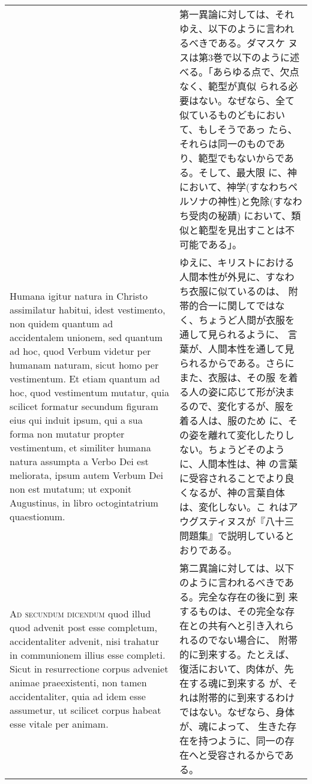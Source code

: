 \documentclass[10pt]{jsarticle} %
\begin{document}
\begin{longtable}{p{21em}p{21em}}
&

第一異論に対しては、それゆえ、以下のように言われるべきである。ダマスケ
ヌスは第3巻で以下のように述べる。「あらゆる点で、欠点なく、範型が真似
られる必要はない。なぜなら、全て似ているものどもにおいて、もしそうであっ
たら、それらは同一のものであり、範型でもないからである。そして、最大限
に、神において、神学(すなわちペルソナの神性)と免除(すなわち受肉の秘蹟)
において、類似と範型を見出すことは不可能である」。

\\



Humana igitur natura in Christo assimilatur habitui, idest vestimento,
non quidem quantum ad accidentalem unionem, sed quantum ad hoc, quod
Verbum videtur per humanam naturam, sicut homo per vestimentum. Et
etiam quantum ad hoc, quod vestimentum mutatur, quia scilicet formatur
secundum figuram eius qui induit ipsum, qui a sua forma non mutatur
propter vestimentum, et similiter humana natura assumpta a Verbo Dei
est meliorata, ipsum autem Verbum Dei non est mutatum; ut exponit
Augustinus, in libro octogintatrium quaestionum.

&

ゆえに、キリストにおける人間本性が外見に、すなわち衣服に似ているのは、
附帯的合一に関してではなく、ちょうど人間が衣服を通して見られるように、
言葉が、人間本性を通して見られるからである。さらにまた、衣服は、その服
を着る人の姿に応じて形が決まるので、変化するが、服を着る人は、服のため
に、その姿を離れて変化したりしない。ちょうどそのように、人間本性は、神
の言葉に受容されることでより良くなるが、神の言葉自体は、変化しない。こ
れはアウグスティヌスが『八十三問題集』で説明しているとおりである。



\\



{\scshape Ad secundum dicendum} quod illud quod advenit post esse
completum, accidentaliter advenit, nisi trahatur in communionem illius
esse completi. Sicut in resurrectione corpus adveniet animae
praeexistenti, non tamen accidentaliter, quia ad idem esse assumetur,
ut scilicet corpus habeat esse vitale per animam.


&

第二異論に対しては、以下のように言われるべきである。完全な存在の後に到
来するものは、その完全な存在との共有へと引き入れられるのでない場合に、
附帯的に到来する。たとえば、復活において、肉体が、先在する魂に到来する
が、それは附帯的に到来するわけではない。なぜなら、身体が、魂によって、
生きた存在を持つように、同一の存在へと受容されるからである。




\end{longtable}
\end{document}
